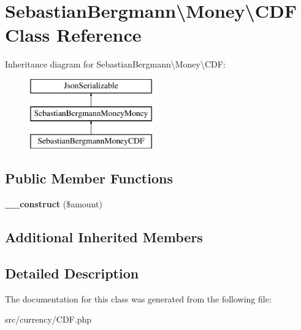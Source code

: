 \hypertarget{classSebastianBergmann_1_1Money_1_1CDF}{}\section{Sebastian\+Bergmann\textbackslash{}Money\textbackslash{}C\+D\+F Class Reference}
\label{classSebastianBergmann_1_1Money_1_1CDF}
Inheritance diagram for Sebastian\+Bergmann\textbackslash{}Money\textbackslash{}C\+D\+F\+:\begin{figure}[H]
\begin{center}
\leavevmode
\includegraphics[height=3.000000cm]{classSebastianBergmann_1_1Money_1_1CDF}
\end{center}
\end{figure}
\subsection*{Public Member Functions}
\begin{DoxyCompactItemize}
\item 
\hypertarget{classSebastianBergmann_1_1Money_1_1CDF_ac505fc18ab711da3f754c989a8ce294f}{}{\bfseries \+\_\+\+\_\+construct} (\$amount)\label{classSebastianBergmann_1_1Money_1_1CDF_ac505fc18ab711da3f754c989a8ce294f}

\end{DoxyCompactItemize}
\subsection*{Additional Inherited Members}


\subsection{Detailed Description}


The documentation for this class was generated from the following file\+:\begin{DoxyCompactItemize}
\item 
src/currency/C\+D\+F.\+php\end{DoxyCompactItemize}
